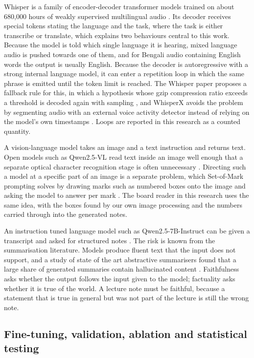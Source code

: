 Whisper is a family of encoder-decoder transformer models trained on about 680,000 hours
of weakly supervised multilingual audio \cite{radford2023whisper}. Its decoder receives
special tokens stating the language and the task, where the task is either transcribe or
translate, which explains two behaviours central to this work. Because the model is told
which single language it is hearing, mixed language audio is pushed towards one of them,
and for Bengali audio containing English words the output is usually English. Because the
decoder is autoregressive with a strong internal language model, it can enter a repetition
loop in which the same phrase is emitted until the token limit is reached. The Whisper
paper proposes a fallback rule for this, in which a hypothesis whose gzip compression
ratio exceeds a threshold is decoded again with sampling \cite{radford2023whisper}, and
WhisperX avoids the problem by segmenting audio with an external voice activity detector
instead of relying on the model's own timestamps \cite{bain2023whisperx}. Loops are
reported in this research as a counted quantity.

A vision-language model takes an image and a text instruction and returns text. Open
models such as Qwen2.5-VL read text inside an image well enough that a separate optical
character recognition stage is often unnecessary \cite{bai2025qwen25vl}. Directing such a
model at a specific part of an image is a separate problem, which Set-of-Mark prompting
solves by drawing marks such as numbered boxes onto the image and asking the model to
answer per mark \cite{yang2023som}. The board reader in this research uses the same idea,
with the boxes found by our own image processing and the numbers carried through into the
generated notes.

An instruction tuned language model such as Qwen2.5-7B-Instruct can be given a transcript
and asked for structured notes \cite{qwen2025qwen25}. The risk is known from the
summarisation literature. Models produce fluent text that the input does not support, and
a study of state of the art abstractive summarisers found that a large share of generated
summaries contain hallucinated content \cite{maynez2020faithfulness}. Faithfulness asks
whether the output follows the input given to the model; factuality asks whether it is
true of the world. A lecture note must be faithful, because a statement that is true in
general but was not part of the lecture is still the wrong note.

\subsection{Fine-tuning, validation, ablation and statistical testing}

